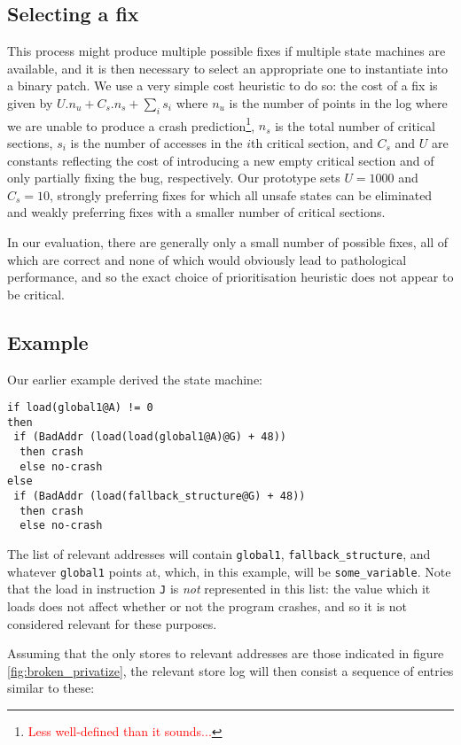 \documentclass[10pt,twocolumn,preprint,natbib,authoryear]{sigplanconf}
\newcommand{\editorial}[1]{\textcolor{red}{\footnote{\textcolor{red}{#1}}}}
\begin{document}
\subsection{Selecting a fix}
\label{sect:selectfix}

This process might produce multiple possible fixes if multiple state
machines are available, and it is then necessary to select an
appropriate one to instantiate into a binary patch.  We use a very
simple cost heuristic to do so: the cost of a fix is given by $U.n_u +
C_s.n_s + {\sum_{i}}s_i$ where $n_u$ is the number of points in the
log where we are unable to produce a crash prediction\editorial{Less
  well-defined than it sounds...}, $n_s$ is the total number of
critical sections, $s_i$ is the number of accesses in the $i$th
critical section, and $C_s$ and $U$ are constants reflecting the cost
of introducing a new empty critical section and of only partially
fixing the bug, respectively.  Our prototype sets $U=1000$ and
$C_s=10$, strongly preferring fixes for which all unsafe states can be
eliminated and weakly preferring fixes with a smaller number of
critical sections.

In our evaluation, there are generally only a small number of possible
fixes, all of which are correct and none of which would obviously lead
to pathological performance, and so the exact choice of prioritisation
heuristic does not appear to be critical.

\subsection{Example}
\label{sect:final_example}

Our earlier example derived the state machine:

\begin{verbatim}
if load(global1@A) != 0
then
 if (BadAddr (load(load(global1@A)@G) + 48))
  then crash
  else no-crash
else
 if (BadAddr (load(fallback_structure@G) + 48))
  then crash
  else no-crash
\end{verbatim}

The list of relevant addresses will contain \verb|global1|,
\verb|fallback_structure|, and whatever \verb|global1| points at,
which, in this example, will be \verb|some_variable|.  Note that the
load in instruction \verb|J| is \emph{not} represented in this list:
the value which it loads does not affect whether or not the program
crashes, and so it is not considered relevant for these purposes.

Assuming that the only stores to relevant addresses are those
indicated in figure \ref{fig:broken_privatize}, the relevant store log
will then consist a sequence of entries similar to these:
\end{document}
